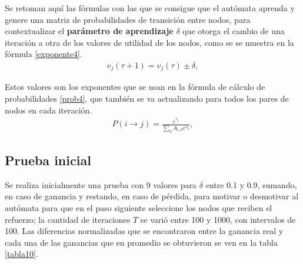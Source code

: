 Se retoman aquí las fórmulas con las que se consigue que el autómata aprenda y genere una matriz de probabilidades de transición entre nodos, para contextualizar el \textbf{parámetro de aprendizaje} $\delta$ que otorga el cambio de una iteración a otra de los valores de utilidad de los nodos, como se se muestra en la fórmula \ref{exponente4}.
\begin{eqnarray}\label{exponente4}
v_j(\tau + 1) = v_j(\tau) \pm \delta,
\end{eqnarray}

Estos valores son los exponentes que se usan en la fórmula de cálculo de probabilidades \ref{prob4}, que también se va actualizando para todos los pares de nodos en cada iteración.
\begin{eqnarray}\label{prob4}
P(i \to j) = \frac{e^{v_j}}{\sum_k A_{i,k} e^{v_k}},
\end{eqnarray}


\subsection{Prueba inicial}

Se realiza inicialmente una prueba con 9 valores para $\delta$ entre 0.1 y 0.9, sumando, en caso de ganancia y restando, en caso de pérdida, para motivar o desmotivar al autómata para que en el paso siguiente seleccione los nodos que reciben el refuerzo; la cantidad de iteraciones $T$ se varió entre 100 y 1000, con intervalos de 100. Las diferencias normalizadas que se encontraron entre la ganancia real y cada una de las ganancias que en promedio se obtuvieron se ven en la tabla \ref{tabla10}.

